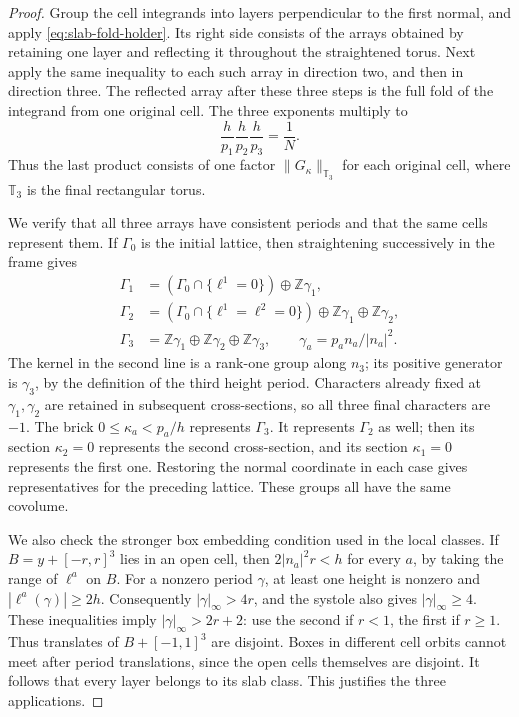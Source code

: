 \documentclass[11pt,letterpaper,reqno]{amsart}
\newcommand{\Z}{\mathbb Z}
\begin{document}
\begin{proof}
Group the cell integrands into layers perpendicular to the first normal,
and apply \eqref{eq:slab-fold-holder}. Its right side consists of the
arrays obtained by retaining one layer and reflecting it throughout
the straightened torus. Next apply the same inequality to each such
array in direction two, and then in direction three. The reflected
array after these three steps is the full fold of the integrand from
one original cell. The three exponents multiply to
\[
 \frac h{p_1}\frac h{p_2}\frac h{p_3}
       =\frac1N.
\]
Thus the last product consists of one factor
$\|G_\kappa\|_{\mathbb T_3}$ for each original cell, where
$\mathbb T_3$ is the final rectangular torus.

We verify that all three arrays have consistent periods and that the
same cells represent them. If $\Gamma_0$ is the initial lattice, then
straightening successively in the frame gives
\begin{align*}
 \Gamma_1&=(\Gamma_0\cap\{\ell^1=0\})\oplus\Z\gamma_1,\\
 \Gamma_2&=(\Gamma_0\cap\{\ell^1=\ell^2=0\})
                                  \oplus\Z\gamma_1\oplus\Z\gamma_2,\\
 \Gamma_3&=\Z\gamma_1\oplus\Z\gamma_2\oplus\Z\gamma_3,
 \qquad \gamma_a=p_an_a/|n_a|^2.
\end{align*}
The kernel in the second line is a rank-one group along $n_3$; its
positive generator is $\gamma_3$, by the definition of the third
height period. Characters already fixed at $\gamma_1,\gamma_2$ are
retained in subsequent cross-sections, so all three final characters
are $-1$. The brick $0\le\kappa_a<p_a/h$ represents $\Gamma_3$.
It represents $\Gamma_2$ as well; then its section $\kappa_2=0$
represents the second cross-section, and its section $\kappa_1=0$
represents the first one. Restoring the normal coordinate in each
case gives representatives for the preceding lattice. These groups
all have the same covolume.

We also check the stronger box embedding condition used in the local
classes. If $B=y+[-r,r]^3$ lies in an open cell, then
$2|n_a|^2r<h$ for every $a$, by taking the range of $\ell^a$ on $B$.
For a nonzero period $\gamma$, at least one height is nonzero and
$|\ell^a(\gamma)|\ge2h$. Consequently
$|\gamma|_\infty>4r$, and the systole also gives
$|\gamma|_\infty\ge4$. These inequalities imply
$|\gamma|_\infty>2r+2$: use the second if $r<1$, the first if
$r\ge1$. Thus translates of $B+[-1,1]^3$ are disjoint. Boxes in
different cell orbits cannot meet after period translations, since
the open cells themselves are disjoint. It follows that every layer
belongs to its slab class. This justifies the three applications.


\end{proof}
\end{document}
